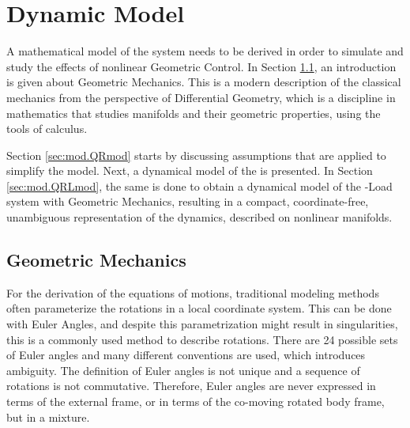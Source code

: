 \chapter{Dynamic Model} \label{ch:model}
A mathematical model of the system needs to be derived in order to simulate and study the effects of nonlinear Geometric Control. In Section \ref{sec:mod.geometric}, an introduction is given about Geometric Mechanics. This is a modern description of the classical mechanics from the perspective of Differential Geometry, which is a discipline in mathematics that studies manifolds and their geometric properties, using the tools of calculus. 

Section \ref{sec:mod.QRmod} starts by discussing assumptions that are applied to simplify the model. Next, a dynamical model of the  is presented. 
In Section \ref{sec:mod.QRLmod}, the same is done to obtain a dynamical model of the -Load system with Geometric Mechanics, resulting in a compact, coordinate-free, unambiguous representation of the dynamics, described on nonlinear manifolds.

\newpage
\section{Geometric Mechanics}\label{sec:mod.geometric}
For the derivation of the equations of motions, traditional modeling methods often parameterize the rotations in a local coordinate system. 
This can be done with Euler Angles, and despite this parametrization might result in singularities, this is a commonly used method to describe rotations. 
There are 24 possible sets of Euler angles and many different conventions are used, which introduces ambiguity. The definition of Euler angles is not unique and a sequence of rotations is not commutative. Therefore, Euler angles are never expressed in terms of the external frame, or in terms of the co-moving rotated body frame, but in a mixture.

